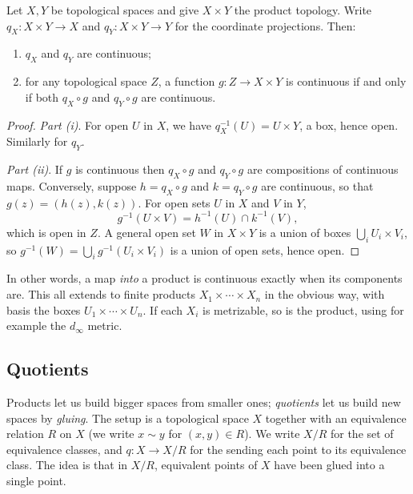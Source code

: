 \documentclass[a4paper]{scrartcl}
\begin{document}
\begin{proposition}
    Let $X, Y$ be topological spaces and give $X \times Y$ the product topology. Write $q_X: X \times Y \rightarrow X$ and $q_Y: X \times Y \rightarrow Y$ for the coordinate projections. Then:
    \begin{enumerate}[label=(\roman*)]
        \item $q_X$ and $q_Y$ are continuous;
        \item for any topological space $Z$, a function $g: Z \rightarrow X \times Y$ is continuous if and only if both $q_X \circ g$ and $q_Y \circ g$ are continuous.
    \end{enumerate}
\end{proposition}
\begin{proof}
    \emph{Part (i)}. For open $U$ in $X$, we have $q_X^{-1}(U) = U \times Y$, a box, hence open. Similarly for $q_Y$.

    \emph{Part (ii)}. If $g$ is continuous then $q_X \circ g$ and $q_Y \circ g$ are compositions of continuous maps. Conversely, suppose $h = q_X \circ g$ and $k = q_Y \circ g$ are continuous, so that $g(z) = (h(z), k(z))$. For open sets $U$ in $X$ and $V$ in $Y$,
    $$
    g^{-1}(U \times V) = h^{-1}(U) \cap k^{-1}(V),
    $$
    which is open in $Z$. A general open set $W$ in $X \times Y$ is a union of boxes $\bigcup_{i} U_i \times V_i$, so $g^{-1}(W) = \bigcup_i g^{-1}(U_i \times V_i)$ is a union of open sets, hence open.
\end{proof}

In other words, a map \emph{into} a product is continuous exactly when its components are. This all extends to finite products $X_1 \times \cdots \times X_n$ in the obvious way, with basis the boxes $U_1 \times \cdots \times U_n$. If each $X_i$ is metrizable, so is the product, using for example the $d_{\infty}$ metric.

\subsection{Quotients}

Products let us build bigger spaces from smaller ones; \emph{quotients} let us build new spaces by \emph{gluing}. The setup is a topological space $X$ together with an equivalence relation $R$ on $X$ (we write $x \sim y$ for $(x, y) \in R$). We write $X/R$ for the set of equivalence classes, and $q: X \rightarrow X/R$ for the  sending each point to its equivalence class. The idea is that in $X/R$, equivalent points of $X$ have been glued into a single point.
\end{document}
